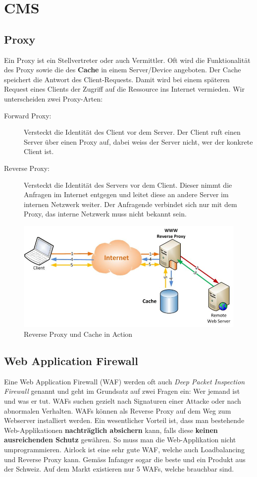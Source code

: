 \chapter{CMS}


\section{Proxy}
Ein Proxy ist ein Stellvertreter oder auch Vermittler. Oft wird die Funktionalität des Proxy sowie die des \textbf{Cache} in einem Server/Device angeboten. Der Cache speichert die Antwort des Client-Requests. Damit wird bei einem späteren Request eines Clients der Zugriff auf die Ressource ins Internet vermieden. Wir unterscheiden zwei Proxy-Arten:

\begin{description}
	\item[Forward Proxy:] Versteckt die Identität des Client vor dem Server. Der Client ruft einen Server über einen Proxy auf, dabei weiss der Server nicht, wer der konkrete Client ist.
	\item[Reverse Proxy:] Versteckt die Identität des Servers vor dem Client.  Dieser nimmt die Anfragen im Internet entgegen und leitet diese an andere Server im internen Netzwerk weiter. Der Anfragende verbindet sich nur mit dem Proxy, das interne Netzwerk muss nicht bekannt sein.
\end{description}

\begin{figure}[h!]
	\centering
	\includegraphics[width=0.7\linewidth]{fig/cms-reverse-proxy-cache}
	\caption{Reverse Proxy und Cache in Action}
	\label{fig:cms-reverse-proxy-cache}
\end{figure}

\section{Web Application Firewall}
Eine Web Application Firewall (WAF) werden oft auch \emph{Deep Packet Inspection Firewall} genannt und geht im Grundsatz auf zwei Fragen ein: Wer jemand ist und was er tut. WAFs suchen gezielt nach Signaturen einer Attacke oder nach abnormalen Verhalten. WAFs können als Reverse Proxy auf dem Weg zum Webserver installiert werden. Ein wesentlicher Vorteil ist, dass man bestehende Web-Applikationen \textbf{nachträglich absichern} kann, falls diese \textbf{keinen ausreichenden Schutz} gewähren. So muss man die Web-Applikation nicht umprogrammieren. Airlock ist eine sehr gute WAF, welche auch Loadbalancing und Reverse Proxy kann. Gemäss Infanger sogar die beste und ein Produkt aus der Schweiz. Auf dem Markt existieren nur 5 WAFs, welche brauchbar sind.

